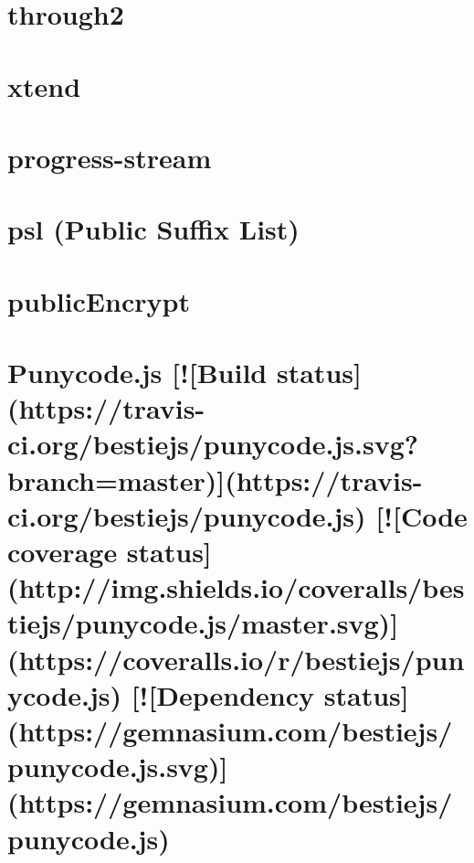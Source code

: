 \documentclass[twoside]{book}
\newcommand{\+}{\discretionary{\mbox{\scriptsize$\hookleftarrow$}}{}{}}
\begin{document}
\chapter{through2}
\label{md_dsmacc_examples_DRmerge_node_modules_progress-stream_node_modules_through2_README}

\chapter{xtend}
\label{md_dsmacc_examples_DRmerge_node_modules_progress-stream_node_modules_xtend_README}

\chapter{progress-\/stream}
\label{md_dsmacc_examples_DRmerge_node_modules_progress-stream_README}

\chapter{psl (Public Suffix List)}
\label{md_dsmacc_examples_DRmerge_node_modules_psl_README}

\chapter{public\+Encrypt}
\label{md_dsmacc_examples_DRmerge_node_modules_public-encrypt_readme}

\chapter{Punycode.\+js \mbox{[}!\mbox{[}Build status\mbox{]}(https\+://travis-\/ci.org/bestiejs/punycode.js.\+svg?branch=master)\mbox{]}(https\+://travis-\/ci.org/bestiejs/punycode.js) \mbox{[}!\mbox{[}Code coverage status\mbox{]}(http\+://img.shields.\+io/coveralls/bestiejs/punycode.js/master.svg)\mbox{]}(https\+://coveralls.io/r/bestiejs/punycode.js) \mbox{[}!\mbox{[}Dependency status\mbox{]}(https\+://gemnasium.com/bestiejs/punycode.js.\+svg)\mbox{]}(https\+://gemnasium.com/bestiejs/punycode.js)}
\label{md_dsmacc_examples_DRmerge_node_modules_punycode_README}

\end{document}

